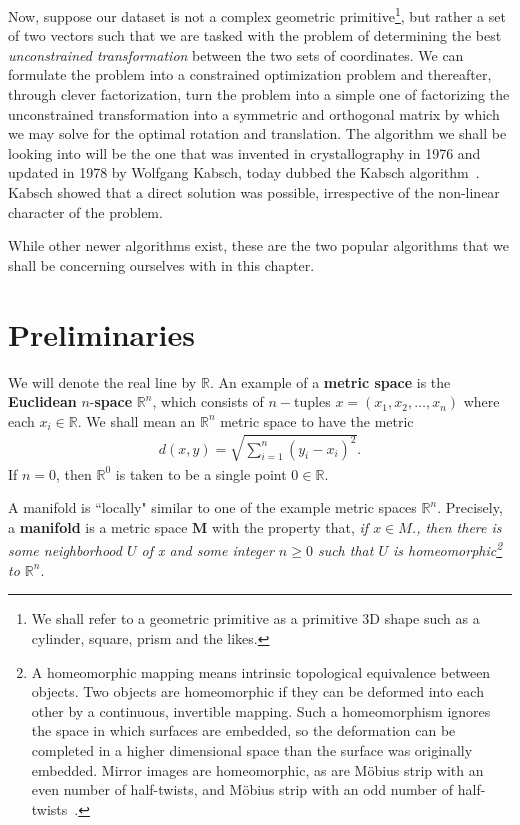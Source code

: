  Now, suppose our dataset is not a complex geometric primitive\footnote{We shall refer to a geometric primitive as a primitive 3D shape such as a cylinder, square, prism and the likes.}, but rather a set of two vectors such that we are tasked with the problem of determining the best \textit{unconstrained transformation} between the two sets of coordinates. We can formulate the problem into a constrained optimization problem and thereafter, through clever factorization, turn the problem into a simple one of factorizing the unconstrained transformation  into a symmetric and orthogonal matrix by which we may solve for the optimal rotation and translation. The algorithm we shall be looking into will be the one that was invented in crystallography in 1976 and updated in 1978 by Wolfgang Kabsch, today dubbed the Kabsch algorithm~\cite{Kabsch1978}. Kabsch showed that a direct solution was possible, irrespective of the non-linear character of the problem.
 
 While other newer algorithms exist, these are the two popular algorithms that we shall be concerning ourselves with in this chapter.
 
 
 \section{Preliminaries}
 \label{chap:opt_rot::prelim}
 
 We will denote the real line by $\mathbb{R}$. An example of a \textbf{metric space} is the \textbf{Euclidean } $n$-\textbf{space} $\mathbb{R}^n$, which consists of $n-$tuples $x = \left(x_1, x_2, \ldots, x_n\right)$ where each $x_i \in \mathbb{R}$. We shall mean an $\mathbb{R}^n$ metric space to have the metric 
 \begin{align}
 d(x,y) = \sqrt{\sum_{i=1}^{n} (y_i - x_i)^2}.
 \end{align} 
 If $n=0$, then $\mathbb{R}^0$ is taken to be a single point $0 \in \mathbb{R}$.
 
 A manifold is ``locally" similar to one of the example metric spaces $\mathbb{R}^n$. Precisely, a \textbf{manifold} is a metric space $\bm{M}$ with the property that, \textit{if $x \in M$., then there is some neighborhood $U$ of x and some integer $n \ge 0$ such that $U$ is homeomorphic\footnote{A homeomorphic mapping means intrinsic topological equivalence between \eg objects. Two objects are homeomorphic if they can be deformed into each other by a continuous, invertible mapping. Such a homeomorphism ignores the space in which surfaces are embedded, so the deformation can be completed in a higher dimensional space than the surface was originally embedded. Mirror images are homeomorphic, as are Möbius strip with an even number of half-twists, and Möbius strip with an odd number of half-twists~\cite{homeomorphic}.} to $\mathbb{R}^n$}. 
 
